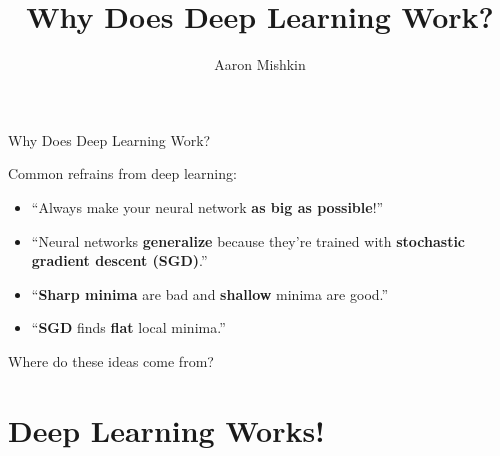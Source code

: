 \documentclass[notheorems]{beamer}
\title{Why Does Deep Learning Work?}
\author{Aaron Mishkin}
\institute{UBC MLRG 2019W1}
\date{}
\begin{document}
    \begin{frame}

        \titlepage

    \end{frame}

    \begin{frame}{Why Does Deep Learning Work?}

        {\Large \centering Common refrains from deep learning: \vspace{0.75cm} }

        \begin{itemize} \large
            \item ``Always make your neural network \textbf{as big as possible}!''\vspace{0.25cm}
            \item ``Neural networks \textbf{generalize} because they're trained with \textbf{stochastic gradient descent (SGD)}.''\vspace{0.25cm}
            \item ``\textbf{Sharp minima} are bad and \textbf{shallow} minima are good.'' \vspace{0.25cm}
            \item ``\textbf{SGD} finds \textbf{flat} local minima.''
        \end{itemize}

        {\Large \vspace{1.25cm} \centering Where do these ideas come from? \vspace{1cm} }

    \end{frame}

    \section{Deep Learning Works!}
\end{document}
